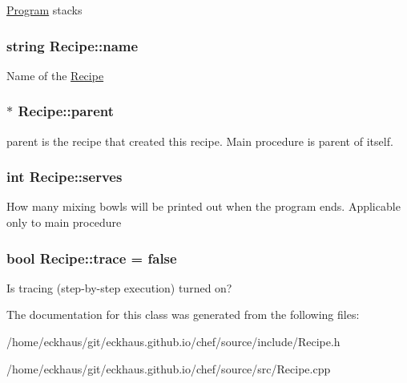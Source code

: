 \hyperlink{classProgram}{Program} stacks \hypertarget{classRecipe_a721508683a186d64b91c64fa1ea72e06}{
\subsubsection[{name}]{\setlength{\rightskip}{0pt plus 5cm}string Recipe\-::name}}\label{classRecipe_a721508683a186d64b91c64fa1ea72e06}
Name of the \hyperlink{classRecipe}{Recipe} \hypertarget{classRecipe_aa0ee8a8dbfef781def252e579bfbc209}{
\subsubsection[{parent}]{$\ast$ Recipe\-::parent}}\label{classRecipe_aa0ee8a8dbfef781def252e579bfbc209}
parent is the recipe that created this recipe. Main procedure is parent of itself. \hypertarget{classRecipe_a265d7fcca7983c4900e76eb10959c9c2}{
\subsubsection[{serves}]{\setlength{\rightskip}{0pt plus 5cm}int Recipe\-::serves}}\label{classRecipe_a265d7fcca7983c4900e76eb10959c9c2}
How many mixing bowls will be printed out when the program ends. Applicable only to main procedure \hypertarget{classRecipe_a88d8c79248361e1c53b8ab3a1b91238c}{
\subsubsection[{trace}]{\setlength{\rightskip}{0pt plus 5cm}bool Recipe\-::trace = false}}\label{classRecipe_a88d8c79248361e1c53b8ab3a1b91238c}
Is tracing (step-\/by-\/step execution) turned on? 

The documentation for this class was generated from the following files\-:\begin{DoxyCompactItemize}
\item 
/home/eckhaus/git/eckhaus.\-github.\-io/chef/source/include/Recipe.\-h\item 
/home/eckhaus/git/eckhaus.\-github.\-io/chef/source/src/Recipe.\-cpp\end{DoxyCompactItemize}
